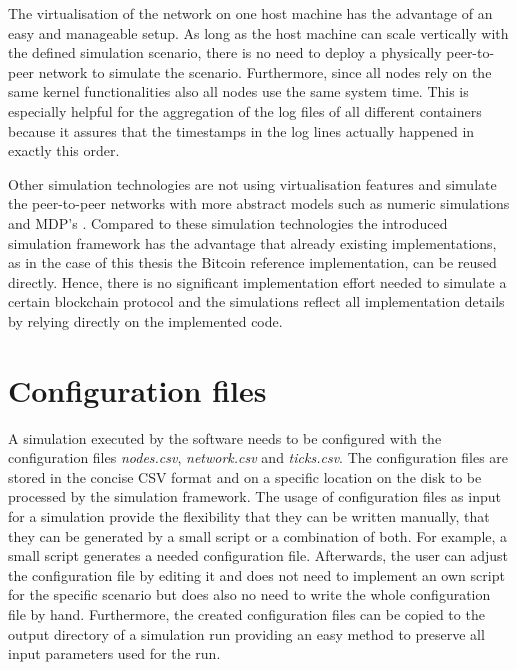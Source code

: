 The virtualisation of the network on one host machine has the advantage of an easy and manageable setup.
As long as the host machine can scale vertically with the defined simulation scenario, there is no need to deploy a physically peer-to-peer network to simulate the scenario.
Furthermore, since all nodes rely on the same kernel functionalities also all nodes use the same system time.
This is especially helpful for the aggregation of the log files of all different containers because it assures that the timestamps in the log lines actually happened in exactly this order.

Other simulation technologies are not using virtualisation features and simulate the peer-to-peer networks with more abstract models such as numeric simulations and MDP's \cite{eyal2014majority, bahack2013theoretical, gervais2015tampering, nayak2016stubborn, sapirshtein2016optimal, gervais2016security}. Compared to these simulation technologies the introduced simulation framework has the advantage that already existing implementations, as in the case of this thesis the Bitcoin reference implementation, can be reused directly.
Hence, there is no significant implementation effort needed to simulate a certain blockchain protocol and the simulations reflect all implementation details by relying directly on the implemented code.

\section{Configuration files}
\label{chap:config_files}

A simulation executed by the software needs to be configured with the configuration files \textit{nodes.csv}, \textit{network.csv} and \textit{ticks.csv}.
The configuration files are stored in the concise CSV format and on a specific location on the disk to be processed by the simulation framework.
The usage of configuration files as input for a simulation provide the flexibility that they can be written manually, that they can be generated by a small script or a combination of both.
For example, a small script generates a needed configuration file.
Afterwards, the user can adjust the configuration file by editing it and does not need to implement an own script for the specific scenario but does also no need to write the whole configuration file by hand.
Furthermore, the created configuration files can be copied to the output directory of a simulation run providing an easy method to preserve all input parameters used for the run.

